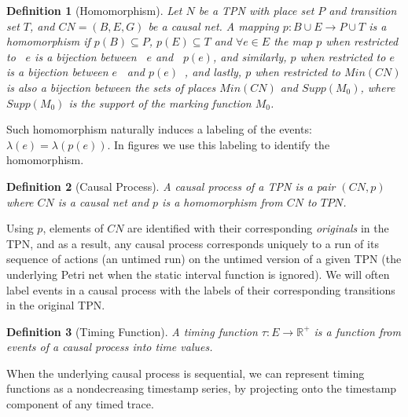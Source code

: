 \documentclass[conference]{IEEEtran}
\DeclareMathOperator*{\pre}{^\bullet}
\newtheorem{definition}{Definition}
\begin{document}
    \begin{definition}[Homomorphism] \label{hom}  Let $N$ be a TPN with place set $P$ and transition set $T$, and ${CN = (B, E, G)}$ be a causal net. 
        A mapping $p : B \cup E \rightarrow P \cup T$ is a \textit{homomorphism} if $p(B) \subseteq P$,  $p(E) \subseteq T$ and $\forall e \in E$ the map $p$ when restricted to $\pre e$ is a bijection between $\pre e$ and $\pre p(e)$, and similarly, $p$ when restricted to $e \pre $ is a bijection between $e \pre $ and $p(e) \pre $, and lastly, $p$ when restricted to $Min(CN)$ is also a bijection between the sets of places $Min(CN)$ and $Supp(M_0)$, where $Supp(M_0)$ is the support of the marking function $M_0$.
    \end{definition}
    Such homomorphism naturally induces a labeling of the events: \(\lambda(e) = \lambda(p(e))\).
    In figures we use this labeling to identify the homomorphism.
    
    \begin{definition}[Causal Process]\label{cp} A \textit{causal process} of a TPN is a pair $(CN, p)$ where $CN$ is a causal net and $p$ is a homomorphism from $CN$ to $TPN$. 
    \end{definition}
    Using $p$, elements of $CN$ are identified with their corresponding \emph{originals} in the TPN, and as a result, any causal process corresponds uniquely to a run of its sequence of actions (an untimed run) on the untimed version of a given TPN (the underlying Petri net when the static interval function is ignored). 
    We will often label events in a causal process with the labels of their corresponding transitions in the original TPN. 

    \begin{definition}[Timing Function]\label{tau} A \textit{timing function} $\tau : E \rightarrow \mathbb{R^+}$ is a function from events of a causal process into time values. 
    \end{definition}

    When the underlying causal process is sequential, we can represent timing functions as a nondecreasing timestamp series, by projecting onto the timestamp component of any timed trace. 

    
\end{document}
